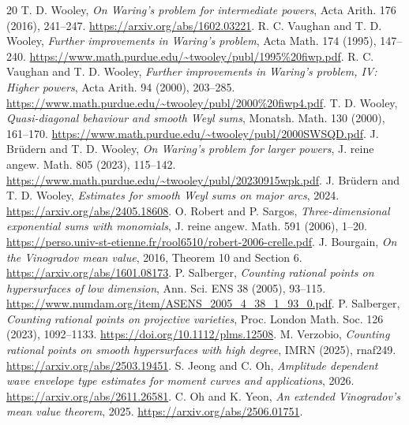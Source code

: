 \documentclass[11pt,letterpaper]{article}
\theoremstyle{remark}
\begin{document}
\begin{thebibliography}{20}\small
{} T. D. Wooley, \emph{On Waring's problem for intermediate powers},
Acta Arith. 176 (2016), 241--247.
\url{https://arxiv.org/abs/1602.03221}.
 R. C. Vaughan and T. D. Wooley, \emph{Further improvements in
Waring's problem}, Acta Math. 174 (1995), 147--240.
\url{https://www.math.purdue.edu/~twooley/publ/1995%20fiwp.pdf}.
 R. C. Vaughan and T. D. Wooley, \emph{Further improvements in
Waring's problem, IV: Higher powers}, Acta Arith. 94 (2000), 203--285.
\url{https://www.math.purdue.edu/~twooley/publ/2000%20fiwp4.pdf}.
 T. D. Wooley, \emph{Quasi-diagonal behaviour and smooth Weyl sums},
Monatsh. Math. 130 (2000), 161--170.
\url{https://www.math.purdue.edu/~twooley/publ/2000SWSQD.pdf}.
 J. Br\"udern and T. D. Wooley, \emph{On Waring's problem for larger
powers}, J. reine angew. Math. 805 (2023), 115--142.
\url{https://www.math.purdue.edu/~twooley/publ/20230915wpk.pdf}.
 J. Br\"udern and T. D. Wooley, \emph{Estimates for smooth Weyl sums
on major arcs}, 2024.
\url{https://arxiv.org/abs/2405.18608}.
 O. Robert and P. Sargos, \emph{Three-dimensional exponential sums
with monomials}, J. reine angew. Math. 591 (2006), 1--20.
\url{https://perso.univ-st-etienne.fr/rool6510/robert-2006-crelle.pdf}.
 J. Bourgain, \emph{On the Vinogradov mean value}, 2016,
Theorem 10 and Section 6. \url{https://arxiv.org/abs/1601.08173}.
 P. Salberger, \emph{Counting rational points on hypersurfaces
of low dimension}, Ann. Sci. ENS 38 (2005), 93--115.
\url{https://www.numdam.org/item/ASENS_2005_4_38_1_93_0.pdf}.
 P. Salberger, \emph{Counting rational points on projective
varieties}, Proc. London Math. Soc. 126 (2023), 1092--1133.
\url{https://doi.org/10.1112/plms.12508}.
 M. Verzobio, \emph{Counting rational points on smooth
hypersurfaces with high degree}, IMRN (2025), rnaf249.
\url{https://arxiv.org/abs/2503.19451}.
 S. Jeong and C. Oh, \emph{Amplitude dependent wave envelope
type estimates for moment curves and applications}, 2026.
\url{https://arxiv.org/abs/2611.26581}.
 C. Oh and K. Yeon, \emph{An extended Vinogradov's mean value
theorem}, 2025. \url{https://arxiv.org/abs/2506.01751}.
\end{thebibliography}
\end{document}
